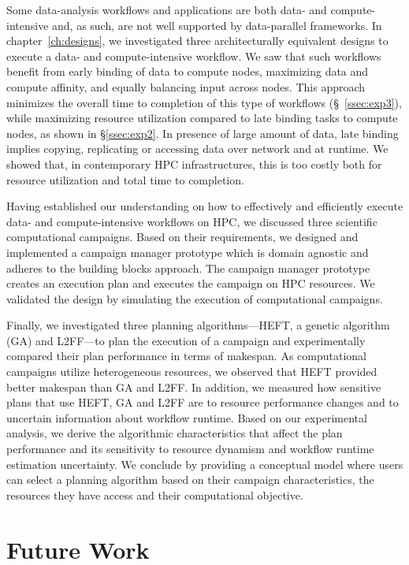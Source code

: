 Some data-analysis workflows and applications are both data- and
compute-intensive and, as such, are not well supported by data-parallel
frameworks. In chapter~\ref{ch:designs}, we investigated three 
architecturally equivalent designs to execute a data- and compute-intensive 
workflow. We saw that such workflows benefit from early binding of data 
to compute nodes, maximizing data and compute affinity, and equally 
balancing input across nodes. This approach minimizes the overall time 
to completion of this type of workflows (\S~\ref{ssec:exp3}), while maximizing resource utilization 
compared to late binding tasks to compute nodes, as shown in \S\ref{ssec:exp2}. In presence of large amount 
of data, late binding implies copying, replicating or accessing data over 
network and at runtime. We showed that, in contemporary HPC infrastructures, 
this is too costly both for resource utilization and total time to completion.


Having established our understanding on how to effectively and efficiently
execute data- and compute-intensive workflows on HPC, we discussed three
scientific computational campaigns. Based on their requirements, we designed and
implemented a campaign manager prototype which is domain agnostic and adheres to
the building blocks approach. The campaign manager prototype creates an
execution plan and executes the campaign on HPC resources. We validated the
design by simulating the execution of computational campaigns.

Finally, we investigated three planning algorithms---HEFT, a genetic algorithm
(GA) and L2FF---to plan the execution of a campaign and experimentally compared
their plan performance in terms of makespan. As computational campaigns utilize
heterogeneous resources, we observed that HEFT provided better makespan than GA
and L2FF. In addition, we measured how sensitive plans that use HEFT, GA and
L2FF are to resource performance changes and to uncertain information about
workflow runtime. Based on our experimental analysis, we derive the algorithmic
characteristics that affect the plan performance and its sensitivity to resource
dynamism and workflow runtime estimation uncertainty. We conclude by providing a
conceptual model where users can select a planning algorithm based on their
campaign characteristics, the resources they have access and their computational
objective.

\section{Future Work}

